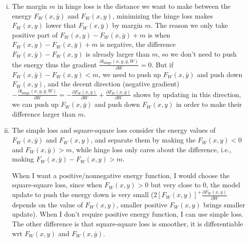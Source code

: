\documentclass[10pt,a4paper]{article}
\theoremstyle{dotlessP}
\begin{document}
\begin{enumerate}[(a)]
\begin{enumerate}[(i)]
		\item The margin $m$ in hinge loss is the distance we want to make between the energy $F_W(x,\bar{y})$ and $F_W(x,
		{y})$, minimizing the hinge loss makes $F_W(x,y)$ lower that $F_W(x,\bar{y})$ by margin $m$. The reason we only take positive part of $F_W(x,y) -F_W(x, \bar{y})+m$ is when  $F_W(x,y) -F_W(x, \bar{y})+m$ is negative, the difference $F_W(x,\bar{y})-F_W(x,y)$ is already larger than $m$, so we don't need to push the energy thus the gradient $\frac{\partial l_\text{hinge} (x,y, \bar{y}, W)   }{\partial W}= 0$. But if $F_W(x,\bar{y})-F_W(x,y) < m$, we need to push up $F_W(x,\bar{y})$ and push down $F_W(x,y)$, and the decent direction (negative gradient)$-\frac{\partial l_\text{hinge} (x,y, \bar{y}, W)   }{\partial W}= -\frac{\partial F_W(x, y)}{\partial W} +\frac{\partial F_W(x, \bar{y})}{\partial W}$ shows by updating in this direction, we can 
		push up $F_W(x,\bar{y})$ and push down $F_W(x,y)$ in order to make their difference larger than $m$.
		
		\item The simple loss and square-square loss consider the energy values of $F_W(x,\bar{y})$ and $F_W(x,y)$, and separate them by making the $F_W(x,y) <0$ and $F_W(x,\bar{y})>m$, while hinge loss only cares about the difference, i.e., making $F_W(x,\bar{y})-F_W(x,y) >m$.
		
		When I want a positive/nonnegative energy function, I would choose the square-square loss, since when $F_W(x,y)>0$ but very close to 0, the model update to push the energy down is very small ($2[F_W(x,y)]^+ \frac{\partial F_W(x, y)}{\partial W} $ depends on the value of $F_W(x,y)$, smaller positive $F_W(x,y)$ brings smaller update).
		When I don't require positive energy function, I can use simple loss. The other difference is that square-square loss is smoother, it is differentiable wrt $F_W(x,y)$ and  $F_W(x,\bar{y})$.
	\end{enumerate}
	
	
\end{enumerate}
\end{document}
